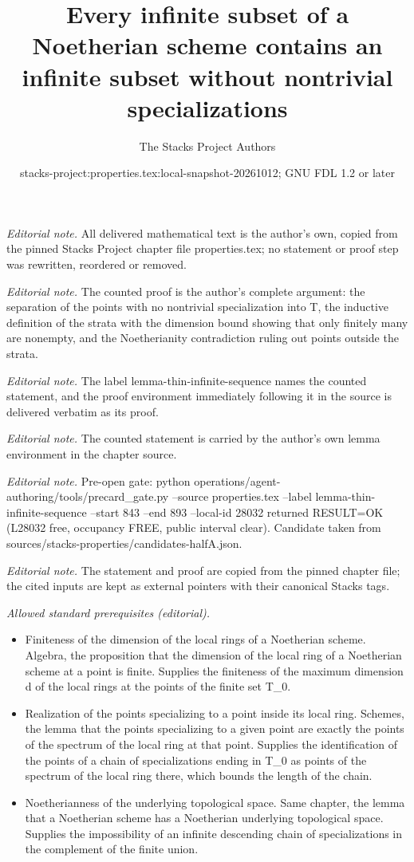 \documentclass[10pt,a4paper]{amsart}
\title{Every infinite subset of a Noetherian scheme contains an infinite subset without nontrivial specializations}
\author{The Stacks Project Authors}
\date{stacks-project:properties.tex:local-snapshot-20261012; GNU FDL 1.2 or later}
\theoremstyle{plain}
\theoremstyle{definition}
\theoremstyle{remark}
\numberwithin{equation}{subsection}
\begin{document}
\maketitle
\noindent\textit{Editorial note.} All delivered mathematical text is the author's own, copied from the pinned Stacks Project chapter file properties.tex; no statement or proof step was rewritten, reordered or removed.\par\medskip
\noindent\textit{Editorial note.} The counted proof is the author's complete argument: the separation of the points with no nontrivial specialization into T, the inductive definition of the strata with the dimension bound showing that only finitely many are nonempty, and the Noetherianity contradiction ruling out points outside the strata.\par\medskip
\noindent\textit{Editorial note.} The label lemma-thin-infinite-sequence names the counted statement, and the proof environment immediately following it in the source is delivered verbatim as its proof.\par\medskip
\noindent\textit{Editorial note.} The counted statement is carried by the author's own lemma environment in the chapter source.\par\medskip
\noindent\textit{Editorial note.} Pre-open gate: python operations/agent-authoring/tools/precard\_gate.py --source properties.tex --label lemma-thin-infinite-sequence --start 843 --end 893 --local-id 28032 returned RESULT=OK (L28032 free, occupancy FREE, public interval clear). Candidate taken from sources/stacks-properties/candidates-halfA.json.\par\medskip
\noindent\textit{Editorial note.} The statement and proof are copied from the pinned chapter file; the cited inputs are kept as external pointers with their canonical Stacks tags.\par\medskip
\noindent\textit{Allowed standard prerequisites (editorial).}\begin{itemize}
\item Finiteness of the dimension of the local rings of a Noetherian scheme. Algebra, the proposition that the dimension of the local ring of a Noetherian scheme at a point is finite. Supplies the finiteness of the maximum dimension d of the local rings at the points of the finite set T\_0.
\item Realization of the points specializing to a point inside its local ring. Schemes, the lemma that the points specializing to a given point are exactly the points of the spectrum of the local ring at that point. Supplies the identification of the points of a chain of specializations ending in T\_0 as points of the spectrum of the local ring there, which bounds the length of the chain.
\item Noetherianness of the underlying topological space. Same chapter, the lemma that a Noetherian scheme has a Noetherian underlying topological space. Supplies the impossibility of an infinite descending chain of specializations in the complement of the finite union.
\end{itemize}\medskip
\end{document}
